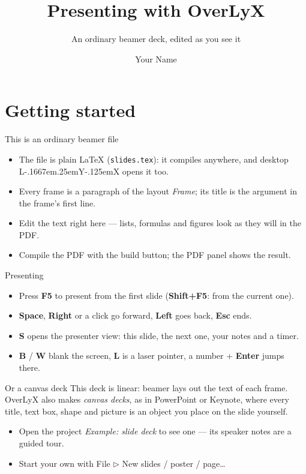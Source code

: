 \documentclass[aspectratio=169]{beamer}
\makeatletter
\providecommand{\LyX}{%
  L\kern-.1667em\lower.25em\hbox{Y}\kern-.125emX\@}
\newcommand\makebeamertitle{\frame{\maketitle}}%
\makeatother
\begin{document}
\title{Presenting with OverLyX}
\subtitle{An ordinary beamer deck, edited as you see it}
\author{Your Name}
\makebeamertitle

\section{Getting started}
\begin{frame}{This is an ordinary beamer file}
\begin{itemize}
\item The file is plain \LaTeX{} (\texttt{slides.tex}): it compiles anywhere, and desktop \LyX{} opens it too.
\item Every frame is a paragraph of the layout \emph{Frame}; its title is the argument in the frame's first line.
\item Edit the text right here --- lists, formulas and figures look as they will in the PDF.
\item Compile the PDF with the build button; the PDF panel shows the result.
\end{itemize}


\end{frame}

\begin{frame}{Presenting}
\begin{itemize}
\item Press \textbf{F5} to present from the first slide (\textbf{Shift+F5}: from the current one).
\item \textbf{Space}, \textbf{Right} or a click go forward, \textbf{Left} goes back, \textbf{Esc} ends.
\item \textbf{S} opens the presenter view: this slide, the next one, your notes and a timer.
\item \textbf{B} / \textbf{W} blank the screen, \textbf{L} is a laser pointer, a number + \textbf{Enter} jumps there.
\end{itemize}


\end{frame}

\begin{frame}{Or a canvas deck}
This deck is linear: beamer lays out the text of each frame. OverLyX also makes \emph{canvas decks}, as in PowerPoint or Keynote, where every title, text box, shape and picture is an object you place on the slide yourself.
\begin{itemize}
\item Open the project \emph{Example: slide deck} to see one --- its speaker notes are a guided tour.
\item Start your own with File $\triangleright$ New slides / poster / page\ldots{}
\end{itemize}
\end{frame}
\end{document}

